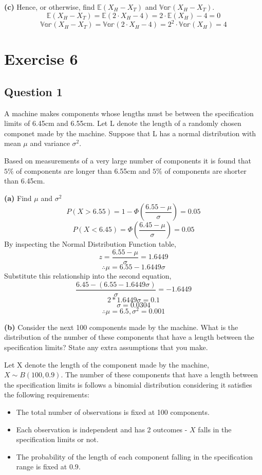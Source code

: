 \documentclass[
]{book}
\providecommand{\tightlist}{%
  \setlength{\itemsep}{0pt}\setlength{\parskip}{0pt}}
\begin{document}
\textbf{(c)} Hence, or otherwise, find \(\mathbb{E}(X_H - X_T)\) and \(\mathbb{Var}(X_H - X_T)\).\\
\[\mathbb{E}(X_H - X_T) = \mathbb{E}(2 \cdot X_H - 4) = 2 \cdot \mathbb{E}(X_H) -4 = 0\]
\[\mathbb{Var}(X_H - X_T) = \mathbb{Var}(2 \cdot X_H - 4) = 2^2 \cdot \mathbb{Var}(X_H) = 4\]

\chapter{Exercise 6}\label{exercise-6}

\section{Question 1}\label{question-1-4}

A machine makes components whose lengths must be between the specification limits of 6.45cm and 6.55cm. Let L denote the length of a randomly chosen componet made by the machine. Suppose that L has a normal distribution with mean \(\mu\) and variance \(\sigma^2\).

Based on measurements of a very large number of components it is found that \(5\%\) of components are longer than 6.55cm and \(5\%\) of components are shorter than 6.45cm.

\textbf{(a)} Find \(\mu\) and \(\sigma^2\)
\[P(X > 6.55) = 1 - \Phi(\frac{6.55 - \mu}{\sigma}) = 0.05\]
\[P(X < 6.45) = \Phi(\frac{6.45 - \mu}{\sigma}) = 0.05\]
By inspecting the Normal Distribution Function table,
\[z = \frac{6.55 - \mu}{\sigma} = 1.6449\]
\[\therefore \mu = 6.55 - 1.6449 \sigma\]
Substitute this relationship into the second equation,
\[\frac{6.45 - (6.55 - 1.6449 \sigma)}{\sigma} = -1.6449\]
\[2 * 1.6449 \sigma = 0.1\]
\[\sigma = 0.0304\]
\[\therefore \mu = 6.5, \sigma^2 = 0.001\]

\textbf{(b)} Consider the next 100 components made by the machine. What is the distribution of the number of these components that have a length between the specification limits? State any extra assumptions that you make.

Let X denote the length of the component made by the machine, \(X \sim B(100, 0.9)\). The number of these components that have a length between the specification limits is follows a binomial distribution considering it satisfies the following requirements:

\begin{itemize}
\tightlist
\item
  The total number of observations is fixed at 100 components.
\item
  Each observation is independent and has 2 outcomes - \(X\) falls in the specification limits or not.
\item
  The probability of the length of each component falling in the specification range is fixed at \(0.9\).
\end{itemize}
\end{document}
